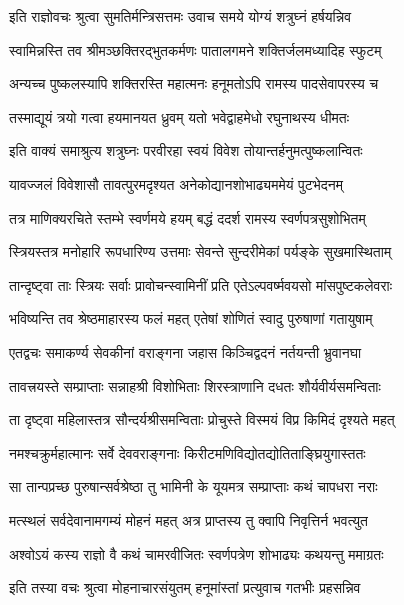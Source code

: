 \twolineshloka
{इति राज्ञोवचः श्रुत्वा सुमतिर्मन्त्रिसत्तमः}
{उवाच समये योग्यं शत्रुघ्नं हर्षयन्निव}%

\twolineshloka
{स्वामिन्नस्ति तव श्रीमञ्छक्तिरद्भुतकर्मणः}
{पातालगमने शक्तिर्जलमध्यादिह स्फुटम्}%

\twolineshloka
{अन्यच्च पुष्कलस्यापि शक्तिरस्ति महात्मनः}
{हनूमतोऽपि रामस्य पादसेवापरस्य च}%

\twolineshloka
{तस्माद्यूयं त्रयो गत्वा हयमानयत ध्रुवम्}
{यतो भवेद्वाहमेधो रघुनाथस्य धीमतः}%


\twolineshloka
{इति वाक्यं समाश्रुत्य शत्रुघ्नः परवीरहा}
{स्वयं विवेश तोयान्तर्हनुमत्पुष्कलान्वितः}%

\twolineshloka
{यावज्जलं विवेशासौ तावत्पुरमदृश्यत}
{अनेकोद्यानशोभाढ्यममेयं पुटभेदनम्}%

\twolineshloka
{तत्र माणिक्यरचिते स्तम्भे स्वर्णमये हयम्}
{बद्धं ददर्श रामस्य स्वर्णपत्रसुशोभितम्}%

\twolineshloka
{स्त्रियस्तत्र मनोहारि रूपधारिण्य उत्तमाः}
{सेवन्ते सुन्दरीमेकां पर्यङ्के सुखमास्थिताम्}%

\twolineshloka
{तान्दृष्ट्वा ताः स्त्रियः सर्वाः प्रावोचन्स्वामिनीं प्रति}
{एतेऽल्पवर्ष्मवयसो मांसपुष्टकलेवराः}%

\twolineshloka
{भविष्यन्ति तव श्रेष्ठमाहारस्य फलं महत्}
{एतेषां शोणितं स्वादु पुरुषाणां गतायुषाम्}%

\twolineshloka
{एतद्वचः समाकर्ण्य सेवकीनां वराङ्गना}
{जहास किञ्चिद्वदनं नर्तयन्ती भ्रुवानघा}%

\twolineshloka
{तावत्त्रयस्ते सम्प्राप्ताः सन्नाहश्री विशोभिताः}
{शिरस्त्राणानि दधतः शौर्यवीर्यसमन्विताः}%

\twolineshloka
{ता दृष्ट्वा महिलास्तत्र सौन्दर्यश्रीसमन्विताः}
{प्रोचुस्ते विस्मयं विप्र किमिदं दृश्यते महत्}%

\twolineshloka
{नमश्चक्रुर्महात्मानः सर्वे देववराङ्गनाः}
{किरीटमणिविद्योतद्योतिताङ्घ्रियुगास्ततः}%

\twolineshloka
{सा तान्पप्रच्छ पुरुषान्सर्वश्रेष्ठा तु भामिनी}
{के यूयमत्र सम्प्राप्ताः कथं चापधरा नराः}%

\twolineshloka
{मत्स्थलं सर्वदेवानामगम्यं मोहनं महत्}
{अत्र प्राप्तस्य तु क्वापि निवृत्तिर्न भवत्युत}%

\twolineshloka
{अश्वोऽयं कस्य राज्ञो वै कथं चामरवीजितः}
{स्वर्णपत्रेण शोभाढ्यः कथयन्तु ममाग्रतः}%


\twolineshloka
{इति तस्या वचः श्रुत्वा मोहनाचारसंयुतम्}
{हनूमांस्तां प्रत्युवाच गतभीः प्रहसन्निव}%


